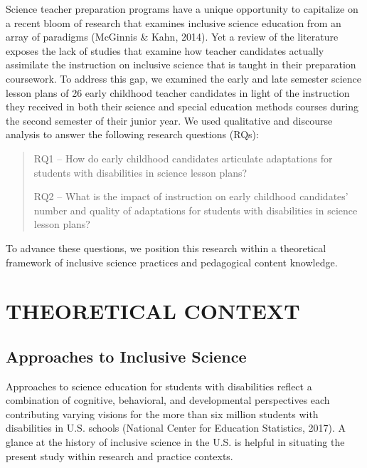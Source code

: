 \documentclass[11.5pt]{sig-alternate} %
\begin{document}
\begin{large}
Science teacher preparation programs have a unique opportunity to capitalize on a recent bloom of research that examines inclusive science education from an array of paradigms (Mc\-Ginnis \& Kahn, 2014).  Yet a review of the literature exposes the lack of studies that examine how teacher candidates actually assimilate the instruction on inclusive science that is taught in their preparation coursework. To address this gap, we examined the early and late semester science lesson plans of 26 early childhood teacher candidates in light of the instruction they received in both their science and special education methods courses during the second semester of their junior year.   We used qualitative and discourse analysis to answer the following research questions (RQs): 

\begin{quote}
RQ1 – How do early childhood candidates articulate adaptations for students with disabilities in science lesson plans?

RQ2 – What is the impact of instruction on early childhood candidates’ number and quality of adaptations for students with disabilities in science lesson plans?
\end{quote}

To advance these questions, we position this research within a theoretical framework of inclusive science practices and pedagogical content knowledge. \\

\section*{THEORETICAL CONTEXT}

\subsection*{Approaches to Inclusive Science}

Approaches to science education for students with disabilities reflect a combination of cognitive, behavioral, and developmental perspectives each contributing varying visions for the more than six million students with disabilities in U.S. schools (National Center for Education Statistics, 2017). A glance at the history of inclusive science in the U.S. is helpful in situating the present study within research and practice contexts. 
	

\end{large}
\end{document}

